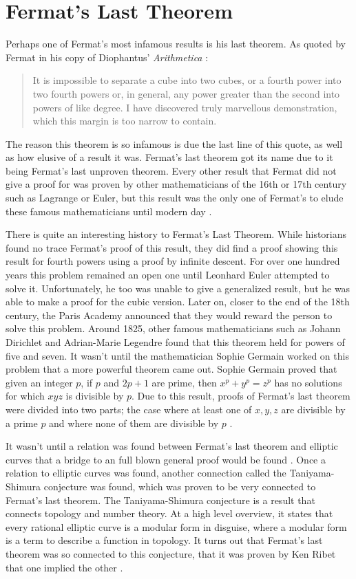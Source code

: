 \documentclass[11pt]{article}
\begin{document}
\section*{Fermat's Last Theorem}
Perhaps one of Fermat's most infamous results is his last theorem.
As quoted by Fermat in his copy of
Diophantus' \emph{Arithmetica} \cite{Kleiner}:
\begin{quote}
    It is impossible to separate a cube into two cubes, or a fourth power into
    two fourth powers or, in general, any power greater than the second into
    powers of like degree. I have discovered truly marvellous demonstration,
    which this margin is too narrow to contain.
\end{quote}
The reason this theorem is so infamous is due the last line of this quote, as
well as how elusive of a result it was.
Fermat's last theorem got its name due to it being Fermat's last unproven
theorem.
Every other result that Fermat did not give a proof for was proven by other 
mathematicians of the 16th or 17th century such as Lagrange or Euler, but this
result was the only one of Fermat's to elude these famous
mathematicians until modern day \cite{Kleiner}.

There is quite an interesting history to Fermat's Last Theorem.
While historians found no trace Fermat's proof of this result, they did find
a proof showing this result for fourth powers using a proof by infinite descent.
For over one hundred years this problem remained an open one until Leonhard
Euler attempted to solve it.
Unfortunately, he too was unable to give a generalized result, but he was able
to make a proof for the cubic version.
Later on, closer to the end of the 18th century, the Paris Academy announced that
they would reward the person to solve this problem.
Around 1825, other famous mathematicians such as Johann Dirichlet and 
Adrian-Marie Legendre found that this theorem held for powers of five and seven.
It wasn't until the mathematician Sophie Germain worked on this problem that
a more powerful theorem came out.
Sophie Germain proved that given an integer $p$, if $p$ and $2p+1$ are prime,
then $x^p + y^p = z^p$ has no solutions for which $xyz$ is divisible by $p$.
Due to this result, proofs of Fermat's last theorem were divided into two parts;
the case where at least one of $x,y,z$ are divisible by a prime $p$ and where
none of them are divisible by $p$ \cite{Kleiner}.

It wasn't until a relation was found between Fermat's last theorem and elliptic
curves that a bridge to an full blown general proof would be found \cite{Kleiner}.
Once a relation to elliptic curves was found, another connection called the
Taniyama-Shimura conjecture was found, which was proven to be very connected to
Fermat's last theorem.
The Taniyama-Shimura conjecture is a result that connects topology and number
theory.
At a high level overview, it states that every rational elliptic curve is a
modular form in disguise, where a modular form is a term to describe a function
in topology.
It turns out that Fermat's last theorem was so connected to this conjecture,
that it was proven by Ken Ribet that one implied the other \cite{Kleiner}.
\end{document}
